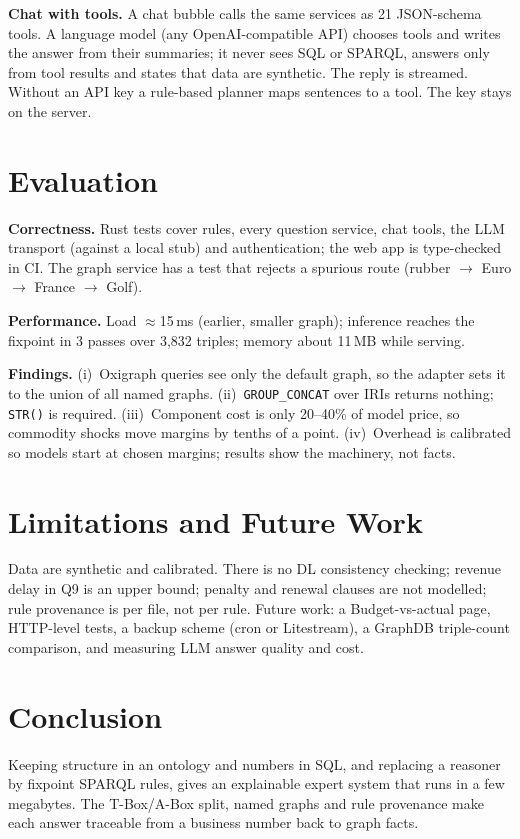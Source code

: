 \documentclass[conference]{IEEEtran}
\begin{document}
\textbf{Chat with tools.} A chat bubble calls the same services as 21 JSON-schema tools. A language model (any OpenAI-compatible API) chooses tools and writes the answer from their summaries; it never sees SQL or SPARQL, answers only from tool results and states that data are synthetic. The reply is streamed. Without an API key a rule-based planner maps sentences to a tool. The key stays on the server.

\section{Evaluation}
\textbf{Correctness.} Rust tests cover rules, every question service, chat tools, the LLM transport (against a local stub) and authentication; the web app is type-checked in CI. The graph service has a test that rejects a spurious route (rubber $\rightarrow$ Euro $\rightarrow$ France $\rightarrow$ Golf).

\textbf{Performance.} Load $\approx$15\,ms (earlier, smaller graph); inference reaches the fixpoint in 3 passes over 3{,}832 triples; memory about 11\,MB while serving.

\textbf{Findings.} (i)~Oxigraph queries see only the default graph, so the adapter sets it to the union of all named graphs. (ii)~\texttt{GROUP\_CONCAT} over IRIs returns nothing; \texttt{STR()} is required. (iii)~Component cost is only 20--40\% of model price, so commodity shocks move margins by tenths of a point. (iv)~Overhead is calibrated so models start at chosen margins; results show the machinery, not facts.

\section{Limitations and Future Work}
Data are synthetic and calibrated. There is no DL consistency checking; revenue delay in Q9 is an upper bound; penalty and renewal clauses are not modelled; rule provenance is per file, not per rule. Future work: a Budget-vs-actual page, HTTP-level tests, a backup scheme (cron or Litestream), a GraphDB triple-count comparison, and measuring LLM answer quality and cost.

\section{Conclusion}
Keeping structure in an ontology and numbers in SQL, and replacing a reasoner by fixpoint SPARQL rules, gives an explainable expert system that runs in a few megabytes. The T-Box/A-Box split, named graphs and rule provenance make each answer traceable from a business number back to graph facts.
\end{document}
